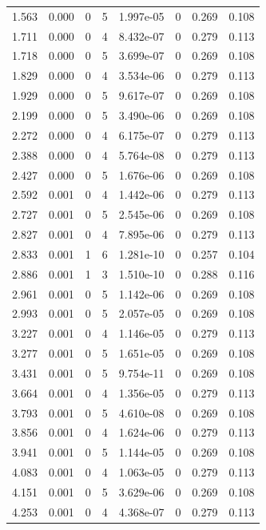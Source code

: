 \documentclass[preview]{standalone}
\begin{document}
{{\begin{tabular}{L{1.2cm}C{1.2cm} C{0.3cm}C{0.5cm} C{1.4cm}C{1.4cm} C{1.4cm}C{1.4cm}}
  1.563  &  0.000  & 0     &  5 &  1.997e-05  & 0  & 0.269 &  0.108   \\ 
  1.711  &  0.000  & 0     &  4 &  8.432e-07  & 0  & 0.279 &  0.113   \\ 
  1.718  &  0.000  & 0     &  5 &  3.699e-07  & 0  & 0.269 &  0.108   \\ 
  1.829  &  0.000  & 0     &  4 &  3.534e-06  & 0  & 0.279 &  0.113   \\ 
  1.929  &  0.000  & 0     &  5 &  9.617e-07  & 0  & 0.269 &  0.108   \\ 
  2.199  &  0.000  & 0     &  5 &  3.490e-06  & 0  & 0.269 &  0.108   \\ 
  2.272  &  0.000  & 0     &  4 &  6.175e-07  & 0  & 0.279 &  0.113   \\ 
  2.388  &  0.000  & 0     &  4 &  5.764e-08  & 0  & 0.279 &  0.113   \\ 
  2.427  &  0.000  & 0     &  5 &  1.676e-06  & 0  & 0.269 &  0.108   \\ 
  2.592  &  0.001  & 0     &  4 &  1.442e-06  & 0  & 0.279 &  0.113   \\ 
  2.727  &  0.001  & 0     &  5 &  2.545e-06  & 0  & 0.269 &  0.108   \\ 
  2.827  &  0.001  & 0     &  4 &  7.895e-06  & 0  & 0.279 &  0.113   \\ 
  2.833  &  0.001  & 1     &  6 &  1.281e-10  & 0  & 0.257 &  0.104   \\ 
  2.886  &  0.001  & 1     &  3 &  1.510e-10  & 0  & 0.288 &  0.116   \\ 
  2.961  &  0.001  & 0     &  5 &  1.142e-06  & 0  & 0.269 &  0.108   \\ 
  2.993  &  0.001  & 0     &  5 &  2.057e-05  & 0  & 0.269 &  0.108   \\ 
  3.227  &  0.001  & 0     &  4 &  1.146e-05  & 0  & 0.279 &  0.113   \\ 
  3.277  &  0.001  & 0     &  5 &  1.651e-05  & 0  & 0.269 &  0.108   \\ 
  3.431  &  0.001  & 0     &  5 &  9.754e-11  & 0  & 0.269 &  0.108   \\ 
  3.664  &  0.001  & 0     &  4 &  1.356e-05  & 0  & 0.279 &  0.113   \\ 
  3.793  &  0.001  & 0     &  5 &  4.610e-08  & 0  & 0.269 &  0.108   \\ 
  3.856  &  0.001  & 0     &  4 &  1.624e-06  & 0  & 0.279 &  0.113   \\ 
  3.941  &  0.001  & 0     &  5 &  1.144e-05  & 0  & 0.269 &  0.108   \\ 
  4.083  &  0.001  & 0     &  4 &  1.063e-05  & 0  & 0.279 &  0.113   \\ 
  4.151  &  0.001  & 0     &  5 &  3.629e-06  & 0  & 0.269 &  0.108   \\ 
  4.253  &  0.001  & 0     &  4 &  4.368e-07  & 0  & 0.279 &  0.113   \\ 
\hline 
\end{tabular} 

}}
\end{document}

